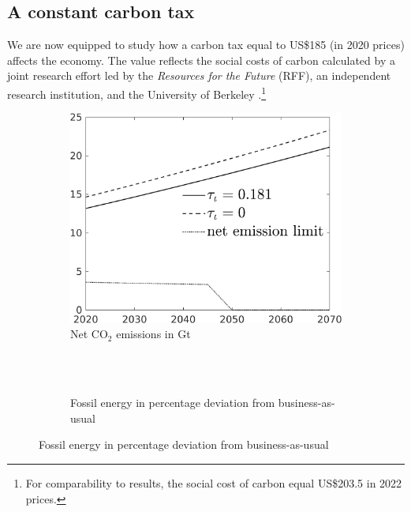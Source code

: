 \subsection{A constant carbon tax}\label{subsec:exp}


We are now equipped to study how a carbon tax  equal to US\$185 (in 2020 prices) affects the economy. The value reflects the social costs of carbon calculated by a joint research effort led by the \textit{Resources for the Future} (RFF), an independent research institution, and the University of Berkeley \citep{Rennert2022ComprehensiveCO2}.\footnote{ For comparability to results, the social cost of carbon equal US\$203.5 in 2022 prices.}


\begin{figure}[h!!]
	\centering
	\caption{A constant carbon tax equal to US\$185 (2020 prices) per ton of carbon  }\label{fig:Leveltauf_nsk0_xgr0_know}		
\begin{subfigure}[]{0.4\textwidth}
	\caption{Net CO$_2$ emissions in Gt \\ \ }
	\includegraphics[width=1\textwidth]{../../codding_model/own_basedOnFried/optimalPol_010922_revision/figures/all_13Sept22/CompTauf_bytaul_Reg5_Emnet_spillover0_nsk0_xgr0_knspil0_sep0_LFlimit0_emsbase0_countec0_GovRev0_etaa0.79_lgd1.png}
\end{subfigure}	
 \begin{minipage}[]{0.1\textwidth}
	\
\end{minipage}
\begin{subfigure}[]{0.4\textwidth}
\caption{Fossil energy in percentage deviation from business-as-usual}

\end{subfigure}
\end{figure}
